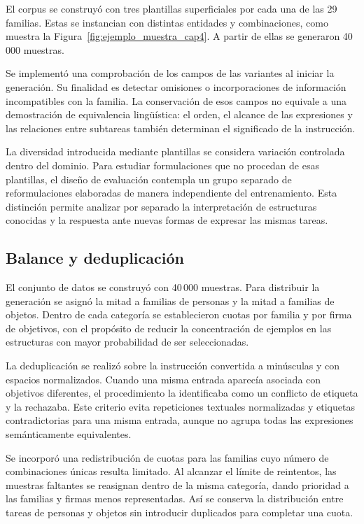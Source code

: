 El corpus se construyó con tres plantillas superficiales por cada una
de las 29 familias. Estas se instancian con distintas entidades y
combinaciones, como muestra la Figura~\ref{fig:ejemplo_muestra_cap4}.
A partir de ellas se generaron 40\,000 muestras.

Se implementó una comprobación de los campos de las variantes al iniciar
la generación. Su finalidad es detectar omisiones o incorporaciones de
información incompatibles con la familia. La conservación de esos campos
no equivale a una demostración de equivalencia lingüística: el orden, el
alcance de las expresiones y las relaciones entre subtareas también
determinan el significado de la instrucción.

La diversidad introducida mediante plantillas se considera variación
controlada dentro del dominio. Para estudiar formulaciones que no
procedan de esas plantillas, el diseño de evaluación contempla un grupo
separado de reformulaciones elaboradas de manera independiente del
entrenamiento. Esta distinción permite analizar por separado la
interpretación de estructuras conocidas y la respuesta ante nuevas
formas de expresar las mismas tareas.


\subsection{Balance y deduplicación}

El conjunto de datos se construyó con 40\,000 muestras. Para distribuir
la generación se asignó la mitad a familias de personas y la mitad a
familias de objetos. Dentro de cada categoría se establecieron cuotas por
familia y por firma de objetivos, con el propósito de reducir la
concentración de ejemplos en las estructuras con mayor probabilidad de
ser seleccionadas.

La deduplicación se realizó sobre la instrucción convertida a minúsculas
y con espacios normalizados. Cuando una misma entrada aparecía asociada
con objetivos diferentes, el procedimiento la identificaba como un
conflicto de etiqueta y la rechazaba. Este criterio evita repeticiones
textuales normalizadas y etiquetas contradictorias para una misma
entrada, aunque no agrupa todas las expresiones semánticamente
equivalentes.

Se incorporó una redistribución de cuotas para las familias cuyo número
de combinaciones únicas resulta limitado. Al alcanzar el límite de
reintentos, las muestras faltantes se reasignan dentro de la misma
categoría, dando prioridad a las familias y firmas menos representadas.
Así se conserva la distribución entre tareas de personas y objetos sin
introducir duplicados para completar una cuota.


